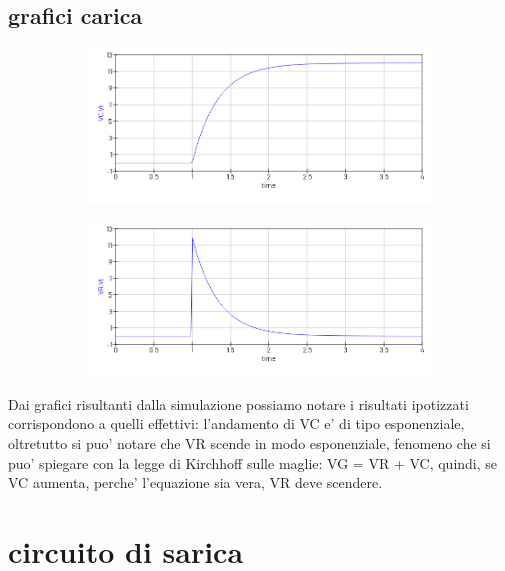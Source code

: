 \documentclass[12pt]{article}
\begin{document}
\subsection*{grafici carica}
\begin{figure}[h!]
  \centering
  \begin{subfigure}[b]{0.49\linewidth}
    \includegraphics[width=\linewidth]{data/carica-VC.png}
  \end{subfigure}
  \begin{subfigure}[b]{0.49\linewidth}
    \includegraphics[width=\linewidth]{data/carica-VR.png}
  \end{subfigure}
  
\end{figure}
Dai grafici risultanti dalla simulazione possiamo notare i risultati ipotizzati corrispondono a quelli effettivi: l'andamento di VC e' di tipo esponenziale, oltretutto si puo' notare che VR scende in modo esponenziale, fenomeno che si puo' spiegare con la legge di Kirchhoff sulle maglie: VG = VR + VC, quindi, se VC aumenta, perche' l'equazione sia vera, VR deve scendere.
\enlargethispage{\baselineskip}


\newpage
\section*{circuito di sarica}
\end{document}
